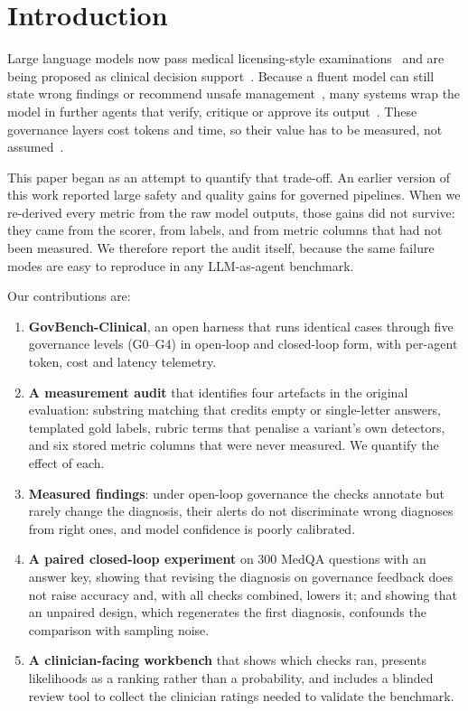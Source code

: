 \documentclass[conference]{IEEEtran}
\begin{document}
\section{Introduction}
Large language models now pass medical licensing-style examinations~\cite{singhal2023large,nori2023capabilities}
and are being proposed as clinical decision support~\cite{rajpurkar2022ai}. Because a fluent model can still state
wrong findings or recommend unsafe management~\cite{hager2024evaluation,pal2023medhalt}, many systems wrap the model in further agents that verify,
critique or approve its output~\cite{hong2023metagpt,wu2023autogen,chen2023agentverse,du2023improving}. These
governance layers cost tokens and time, so their value has to be measured, not assumed~\cite{bedi2025optimization}.

This paper began as an attempt to quantify that trade-off. An earlier version of this work reported large safety
and quality gains for governed pipelines. When we re-derived every metric from the raw model outputs, those gains
did not survive: they came from the scorer, from labels, and from metric columns that had not been measured. We
therefore report the audit itself, because the same failure modes are easy to reproduce in any LLM-as-agent
benchmark.

Our contributions are:
\begin{enumerate}
  \item \textbf{GovBench-Clinical}, an open harness that runs identical cases through five governance levels
  (G0--G4) in open-loop and closed-loop form, with per-agent token, cost and latency telemetry.
  \item \textbf{A measurement audit} that identifies four artefacts in the original evaluation: substring matching
  that credits empty or single-letter answers, templated gold labels, rubric terms that penalise a variant's own
  detectors, and six stored metric columns that were never measured. We quantify the effect of each.
  \item \textbf{Measured findings}: under open-loop governance the checks annotate but rarely change the diagnosis,
  their alerts do not discriminate wrong diagnoses from right ones, and model confidence is poorly calibrated.
  \item \textbf{A paired closed-loop experiment} on 300 MedQA questions with an answer key, showing that revising
  the diagnosis on governance feedback does not raise accuracy and, with all checks combined, lowers it; and showing
  that an unpaired design, which regenerates the first diagnosis, confounds the comparison with sampling noise.
  \item \textbf{A clinician-facing workbench} that shows which checks ran, presents likelihoods as a ranking rather
  than a probability, and includes a blinded review tool to collect the clinician ratings needed to validate the
  benchmark.
\end{enumerate}
\end{document}
